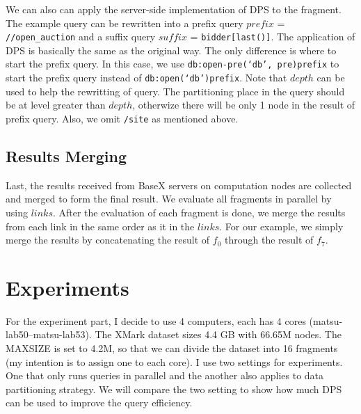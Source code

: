We can also can apply the server-side implementation of DPS to the fragment. The
example query can be rewritten into a prefix query $prefix$ =
\texttt{//open\_auction} and a suffix query $suffix$ = \texttt{bidder[last()]}.
The application of DPS is basically the same as the original way. The only
difference is where to start the prefix query. In this case, we use
\texttt{db:open-pre(`db', pre)prefix} to start the prefix query instead of
\texttt{db:open(`db')prefix}. Note that $depth$ can be used to help the
rewritting of query. The partitioning place in the query should be at level
greater than $depth$, otherwize there will be only 1 node in the result of
prefix query. Also, we omit \texttt{/site} as mentioned above.


\subsection{Results Merging}

Last, the results received from BaseX servers on computation nodes are collected
and merged to form the final result. We evaluate all fragments in parallel by
using $links$. After the evaluation of each fragment is done, we merge the
results from each link in the same order as it in the $links$. For our example,
we simply merge the results by concatenating the result of $f_0$ through the
result of $f_7$.


\section{Experiments}

For the experiment part, I decide to use 4 computers, each has 4 cores
(matsu-lab50--matsu-lab53). The XMark dataset sizes 4.4 GB with 66.65M nodes.
The MAXSIZE is set to 4.2M, so that we can divide the dataset into 16 fragments
(my intention is to assign one to each core). I use two settings for
experiments. One that only runs queries in parallel and the another also applies
to data partitioning strategy. We will compare the two setting to show how much
DPS can be used to improve the query efficiency.

